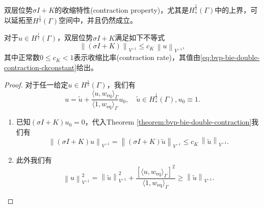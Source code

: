 双层位势$\sigma I + K$的收缩特性(contraction property)，尤其是$H_{*}^{\frac{1}{2}}(\Gamma)$中的上界，可以延拓至$H^{\frac{1}{2}}(\Gamma)$空间中，并且仍然成立。
\begin{corollary}[双层位势收缩比率]
  \label{corollary:bvp-bie-double-contraction-extention-gamma}
  对于$u \in H^{\frac{1}{2}}(\Gamma)$，双层位势$\sigma I + K$满足如下不等式
  \begin{equation}
    \label{eq:bvp-bie-double-contraction-extention-gamma}
    \left\|
    \left(
    \sigma I + K
    \right)
    \right\|_{V^{-1}}
    \le c_{K} \, \left\| u \right\|_{V^{-1}},
  \end{equation}
  其中正常数$0 \le c_{K} < 1$表示收缩比率(contraction rate)，其值由\eqref{eq:bvp-bie-double-contraction-ckconstant}给出。
\end{corollary}
\begin{proof}
  对于任一给定$u \in H^{\frac{1}{2}}(\Gamma)$，我们有
  \begin{equation*}
    u = \widetilde{u} + \frac{
    \langle u, w_{\text{eq}} \rangle_{\Gamma}
    }{
    \langle 1, w_{\text{eq}} \rangle_{\Gamma}
    } u_{0}, \quad \widetilde{u} \in H_{*}^{\frac{1}{2}}(\Gamma), u_{0} \equiv 1.
  \end{equation*}
\begin{enumerate}
  \item 已知$\left( \sigma I + K \right) u_{0} = 0$，代入Theorem \ref{theorem:bvp-bie-double-contraction}我们有
  \begin{equation*}
    \left\|
    \left( \sigma I + K \right) u
    \right\|_{V^{-1}}
    =
    \left\|
    \left( \sigma I + K \right) \widetilde{u}
    \right\|_{V^{-1}}
    \le c_{K} \, \left\| \widetilde{u} \right\|_{V^{-1}}.
  \end{equation*}
  \item 此外我们有
  \begin{equation*}
    \left\| u \right\|_{V^{-1}}^{2}
    = \left\| \widetilde{u} \right\|_{V^{-1}}^{2}
    + \frac{
    \left[
    \langle
    u, w_{\text{eq}}
    \rangle_{\Gamma}
    \right]^2
    }{
    \langle
    1, w_{\text{eq}}
    \rangle_{\Gamma}
    }
    \ge
    \left\| \widetilde{u} \right\|_{V^{-1}}.
  \end{equation*}
\end{enumerate}
\end{proof}

